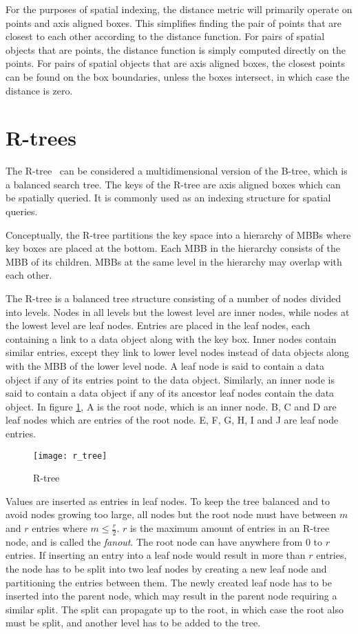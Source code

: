 For the purposes of spatial indexing, the distance metric will primarily operate on points and axis aligned boxes. This simplifies finding the pair of points that are closest to each other according to the distance function. For pairs of spatial objects that are points, the distance function is simply computed directly on the points. For pairs of spatial objects that are axis aligned boxes, the closest points can be found on the box boundaries, unless the boxes intersect, in which case the distance is zero.

\section{R-trees}

The R-tree~\cite{guttman1984r} can be considered a multidimensional version of the B-tree, which is a balanced search tree. The keys of the R-tree are axis aligned boxes which can be spatially queried. It is commonly used as an indexing structure for spatial queries.

Conceptually, the R-tree partitions the key space into a hierarchy of MBBs where key boxes are placed at the bottom. Each MBB in the hierarchy consists of the MBB of its children. MBBs at the same level in the hierarchy may overlap with each other.

The R-tree is a balanced tree structure consisting of a number of nodes divided into levels. Nodes in all levels but the lowest level are inner nodes, while nodes at the lowest level are leaf nodes. Entries are placed in the leaf nodes, each containing a link to a data object along with the key box. Inner nodes contain similar entries, except they link to lower level nodes instead of data objects along with the MBB of the lower level node. A leaf node is said to contain a data object if any of its entries point to the data object. Similarly, an inner node is said to contain a data object if any of its ancestor leaf nodes contain the data object. In figure \ref{fig:r-tree}, A is the root node, which is an inner node. B, C and D are leaf nodes which are entries of the root node. E, F, G, H, I and J are leaf node entries.

\begin{figure}[h]
    \centering
    \texttt{[image: r\_tree]}
    \caption{R-tree}
    \label{fig:r-tree}
\end{figure}

Values are inserted as entries in leaf nodes. To keep the tree balanced and to avoid nodes growing too large, all nodes but the root node must have between \(m\) and \(r\) entries where \(m \leq \frac{r}{2}\). \(r\) is the maximum amount of entries in an R-tree node, and is called the \emph{fanout}. The root node can have anywhere from \(0\) to \(r\) entries. If inserting an entry into a leaf node would result in more than \(r\) entries, the node has to be split into two leaf nodes by creating a new leaf node and partitioning the entries between them. The newly created leaf node has to be inserted into the parent node, which may result in the parent node requiring a similar split. The split can propagate up to the root, in which case the root also must be split, and another level has to be added to the tree.

